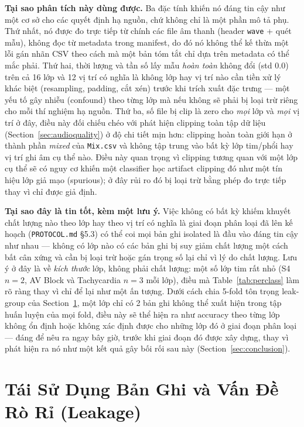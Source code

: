 \documentclass[11pt]{article}
\begin{document}
\textbf{Tại sao phân tích này dùng được.} Ba đặc tính khiến nó đáng tin
cậy như một cơ sở cho các quyết định hạ nguồn, chứ không chỉ là một phần
mô tả phụ. Thứ nhất, nó được đo trực tiếp từ chính các file âm thanh
(header \texttt{wave} + quét mẫu), không đọc từ metadata trong manifest,
do đó nó không thể kế thừa một lỗi gán nhãn CSV theo cách mà một bản tóm
tắt chỉ dựa trên metadata có thể mắc phải. Thứ hai, thời lượng và tần số
lấy mẫu \emph{hoàn toàn} không đổi (std 0.0) trên cả 16 lớp và 12 vị trí
có nghĩa là không lớp hay vị trí nào cần tiền xử lý khác biệt (resampling,
padding, cắt xén) trước khi trích xuất đặc trưng --- một yếu tố gây nhiễu
(confound) theo từng lớp mà nếu không sẽ phải bị loại trừ riêng cho mỗi
thí nghiệm hạ nguồn. Thứ ba, số file bị clip là zero cho \emph{mọi} lớp và
\emph{mọi} vị trí ở đây, điều này đối chiếu chéo với phát hiện clipping
toàn tập dữ liệu (Section~\ref{sec:audioquality}) ở độ chi tiết mịn hơn:
clipping hoàn toàn giới hạn ở thành phần \emph{mixed} của \texttt{Mix.csv}
và không tập trung vào bất kỳ lớp tim/phổi hay vị trí ghi âm cụ thể nào.
Điều này quan trọng vì clipping tương quan với một lớp cụ thể sẽ có nguy
cơ khiến một classifier học artifact clipping đó như một tín hiệu lớp giả
mạo (spurious); ở đây rủi ro đó bị loại trừ bằng phép đo trực tiếp thay vì
chỉ được giả định.

\textbf{Tại sao đây là tin tốt, kèm một lưu ý.} Việc không có bất kỳ
khiếm khuyết chất lượng nào theo lớp hay theo vị trí có nghĩa là giai
đoạn phân loại đã lên kế hoạch (\texttt{PROTOCOL.md} \S5.3) có thể coi mọi
bản ghi isolated là đầu vào đáng tin cậy như nhau --- không có lớp nào có
các bản ghi bị suy giảm chất lượng một cách bất cân xứng và cần bị loại
trừ hoặc gán trọng số lại chỉ vì lý do chất lượng. Lưu ý ở đây là về
\emph{kích thước} lớp, không phải chất lượng: một số lớp tim rất nhỏ (S4
$n{=}2$, AV Block và Tachycardia $n{=}3$ mỗi lớp), điều mà
Table~\ref{tab:perclass} làm rõ ràng thay vì chỉ để lại như một ấn tượng.
Dưới cách chia 5-fold tôn trọng leak-group của Section~\ref{sec:leakage},
một lớp chỉ có 2 bản ghi không thể xuất hiện trong tập huấn luyện của mọi
fold, điều này sẽ thể hiện ra như accuracy theo từng lớp không ổn định
hoặc không xác định được cho những lớp đó ở giai đoạn phân loại --- đáng
để nêu ra ngay bây giờ, trước khi giai đoạn đó được xây dựng, thay vì phát
hiện ra nó như một kết quả gây bối rối sau này (Section~\ref{sec:conclusion}).

\section{Tái Sử Dụng Bản Ghi và Vấn Đề Rò Rỉ (Leakage)}
\label{sec:leakage}
\end{document}
